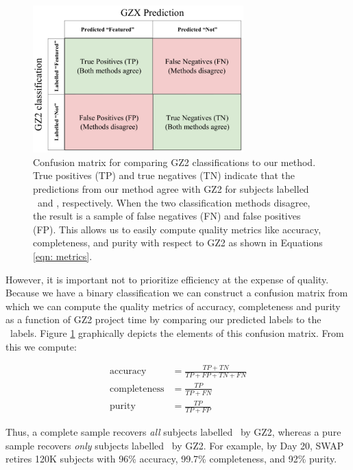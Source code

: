 \begin{figure} 
\centering
\includegraphics[width=3.2in]{Figures/human_machine/confusionmatrix.pdf}
\caption[Confusion matrix between predictions and ground truth defines quality metrics.]{Confusion matrix for comparing GZ2 classifications to our method.  True positives (TP) and true negatives (TN) indicate that the predictions from our method agree with GZ2 for subjects labelled \feat~and \notfeat, respectively. When the two classification methods disagree, the result is a sample of false negatives (FN) and false positives (FP). This allows us to easily compute  quality metrics like accuracy, completeness, and purity with respect to GZ2 as shown in Equations \ref{eqn: metrics}.} 
\label{fig: confusion matrix}
\end{figure}

However, it is important not to prioritize efficiency at the expense of quality. Because we have a binary classification we can construct a confusion matrix from which we can compute the quality metrics of accuracy, completeness and purity as a function of GZ2 project time by comparing our predicted labels to the \raw~labels. Figure \ref{fig: confusion matrix}
graphically depicts the elements of this confusion matrix. From this we compute: 
 
\begin{align*}\label{eqn: metrics}
\mathrm{accuracy} &= \frac{TP + TN}{TP + FP + TN + FN} \\
\mathrm{completeness} &= \frac{TP}{TP +FN }\tag{3} \\
\mathrm{purity} &= \frac{TP}{TP + FP}
\end{align*}

Thus, a complete sample recovers \textit{all} subjects labelled \feat~by GZ2, whereas a pure sample recovers \textit{only} subjects labelled \feat~by GZ2. For example, by Day 20, SWAP retires 120K subjects with 96\% accuracy, 99.7\% completeness, and 92\% purity. 
 
